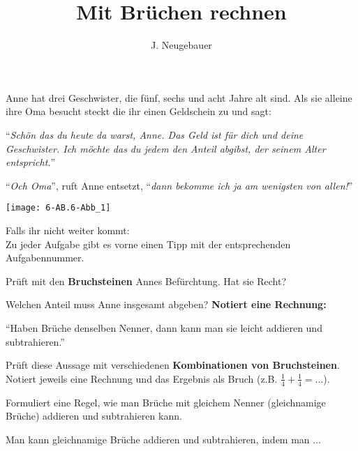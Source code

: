 \documentclass[10pt, a4paper]{scrartcl}
\author{J. Neugebauer}
\title{Mit Brüchen rechnen}
\date{\Heute}
\begin{document}
\ReiheTitel

\medskip
\begin{minipage}{0.7\textwidth}
Anne hat drei Geschwister, die fünf, sechs und acht Jahre alt sind. Als sie 
alleine ihre Oma besucht steckt die ihr einen Geldschein zu und sagt: \medskip

\enquote{\textit{Schön das du heute da warst, Anne. Das Geld ist für dich und deine 
Geschwister. Ich möchte das du jedem den Anteil abgibst, der seinem Alter entspricht.}} \medskip

\enquote{\textit{Och Oma}}, ruft Anne entsetzt, \enquote{\textit{dann bekomme ich ja am wenigsten von allen!}}
\end{minipage}\hfill
\begin{minipage}{4cm}
	\texttt{[image: 6-AB.6-Abb\_1]}
\end{minipage}

\begin{center}\footnotesize
Falls ihr nicht weiter kommt:\\
Zu jeder Aufgabe gibt es vorne einen Tipp mit der entsprechenden Aufgabennummer.
\end{center}

\begin{aufgabe}
	Prüft mit den \textbf{Bruchsteinen} Annes Befürchtung. Hat sie Recht?
\end{aufgabe}
\medskip

\begin{aufgabe}
	Welchen Anteil muss Anne insgesamt abgeben? \textbf{Notiert eine Rechnung:}
	
\end{aufgabe}
\medskip

\begin{aufgabe}
	\enquote{Haben Brüche denselben Nenner, dann kann man sie leicht addieren und subtrahieren.}
	
	Prüft diese Aussage mit verschiedenen \textbf{Kombinationen von Bruchsteinen}. Notiert jeweils eine Rechnung und das Ergebnis als Bruch (z.B. $\frac{1}{4} + \frac{1}{4} = $...).
	
\end{aufgabe}
\medskip

\begin{aufgabe}
	Formuliert eine Regel, wie man Brüche mit gleichem Nenner (gleichnamige Brüche) addieren und subtrahieren kann.
	
	Man kann gleichnamige Brüche addieren und subtrahieren, indem man ...
	
\end{aufgabe}
\end{document}

